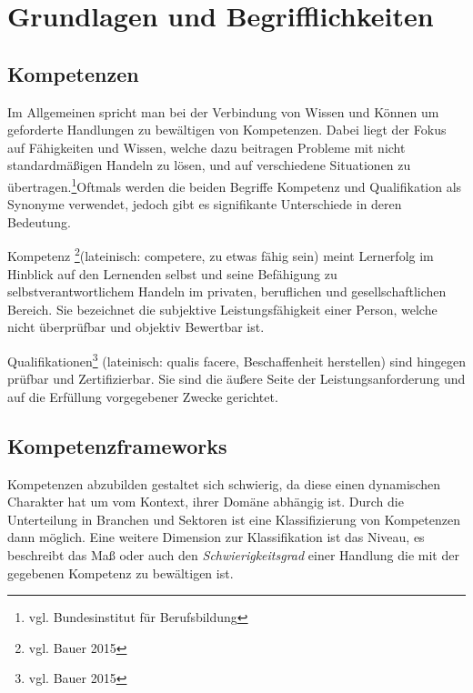 \section{Grundlagen und Begrifflichkeiten}\label{2_grundlagen}


\subsection{Kompetenzen}\label{competencies}

Im Allgemeinen spricht man bei der Verbindung von Wissen und Können um geforderte Handlungen zu bewältigen von Kompetenzen. Dabei liegt der Fokus auf Fähigkeiten und Wissen, welche dazu beitragen Probleme mit nicht standardmäßigen Handeln zu lösen, und auf verschiedene Situationen zu übertragen.\footnote{vgl. Bundesinstitut für Berufsbildung\cite{bibb}}Oftmals werden die beiden Begriffe Kompetenz und Qualifikation als Synonyme verwendet, jedoch gibt es signifikante Unterschiede in deren Bedeutung.
\vspace{1em}

Kompetenz \footnote{vgl. Bauer 2015\cite{Bauer2015}}(lateinisch: competere, zu etwas fähig sein) meint Lernerfolg im Hinblick auf den Lernenden selbst und seine Befähigung zu selbstverantwortlichem Handeln im privaten, beruflichen und gesellschaftlichen Bereich. Sie bezeichnet die subjektive Leistungsfähigkeit einer Person, welche nicht überprüfbar und objektiv Bewertbar ist.\newline

Qualifikationen\footnote{vgl. Bauer 2015\cite{Bauer2015}} (lateinisch: qualis facere, Beschaffenheit herstellen) sind hingegen prüfbar und Zertifizierbar. Sie sind die äußere Seite der Leistungsanforderung und auf die Erfüllung vorgegebener Zwecke gerichtet. 


\subsection{Kompetenzframeworks}

Kompetenzen abzubilden gestaltet sich schwierig, da diese einen dynamischen Charakter hat um vom Kontext, ihrer Domäne abhängig ist. Durch die Unterteilung in Branchen und Sektoren ist eine Klassifizierung von Kompetenzen dann möglich. Eine weitere Dimension zur Klassifikation ist das Niveau, es beschreibt das Maß oder auch den \emph{Schwierigkeitsgrad} einer Handlung die mit der gegebenen Kompetenz zu bewältigen ist. 
\vspace{1em}

